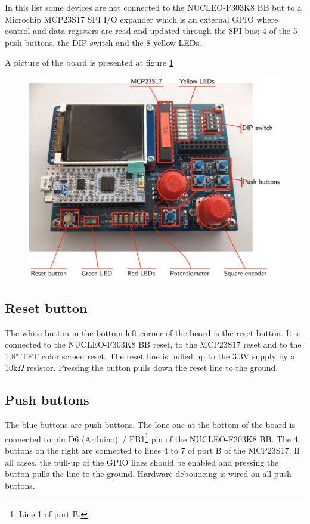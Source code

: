 \documentclass[11pt]{report}
\begin{document}
In this list some devices are not connected to the NUCLEO-F303K8 BB but to a Microchip MCP23S17 SPI I/O expander which is an external GPIO where control and data registers are read and updated through the SPI bus: 4 of the 5 push buttons, the DIP-switch and the 8 yellow LEDs.

A picture of the board is presented at figure \ref{pic:board}

\begin{figure}[htbp] %
   \centering
   \includegraphics[scale=.7]{img/board.pdf} 
   \label{pic:board}
\end{figure}

\subsection{Reset button}

The white button in the bottom left corner of the board is the reset button. It is connected to the NUCLEO-F303K8 BB reset, to the MCP23S17 reset and to the 1.8" TFT color screen reset. The reset line is pulled up to the 3.3V supply by a 10k$\Omega$ resistor. Pressing the button pulls down the reset line to the ground.

\subsection{Push buttons}

The blue buttons are push buttons. The lone one at the bottom of the board is connected to pin D6 (Arduino)~/ PB1\footnote{Line 1 of port B.} pin of the NUCLEO-F303K8 BB. The 4 buttons on the right are connected to lines 4 to 7 of port B of the MCP23S17. Il all cases, the pull-up of the GPIO lines should be enabled and pressing the button pulls the line to the ground. Hardware debouncing is wired on all push buttons.
\end{document}
